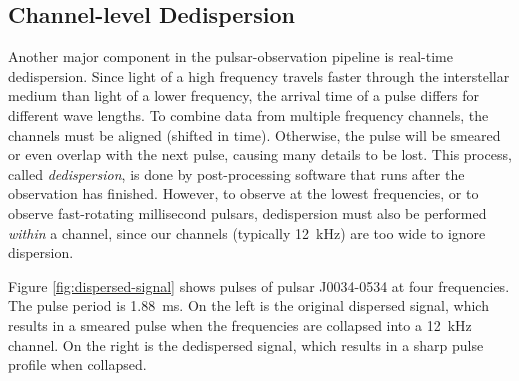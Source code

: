 \documentclass{llncs}
\begin{document}


\subsection{Channel-level Dedispersion}

Another major component in the pulsar-observation pipeline is real-time dedispersion.  Since light of a high frequency travels faster through the interstellar medium than light of a lower frequency, the arrival time of a pulse differs for different wave lengths. To combine data from multiple frequency channels, the channels must be aligned (shifted in time). Otherwise, the pulse will be smeared or even overlap with the next pulse, causing many details to be lost. This process, called \emph{dedispersion}, is done by post-processing software that runs after the observation has finished.  However, to observe at the lowest frequencies, or to observe fast-rotating millisecond pulsars, dedispersion must also be performed \emph{within\/} a channel, since our channels (typically 12~kHz) are too wide to ignore dispersion.

Figure \ref{fig:dispersed-signal} shows pulses of pulsar J0034-0534 at four frequencies. The pulse period is 1.88~ms. On the left is the original dispersed signal, which results in a smeared pulse when the frequencies are collapsed into a 12~kHz channel. On the right is the dedispersed signal, which results in a sharp pulse profile when collapsed.
\end{document}
